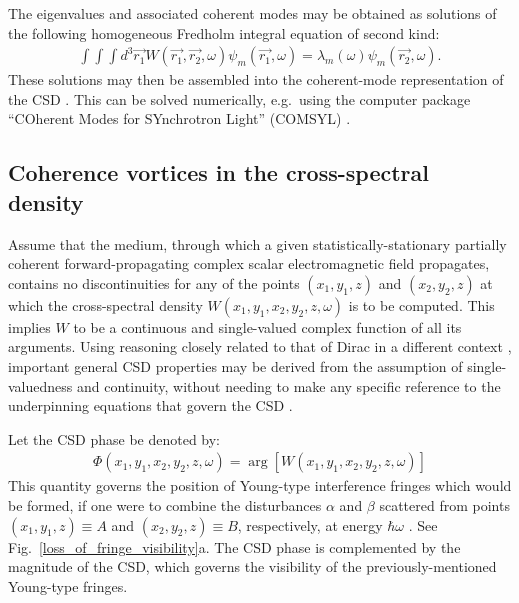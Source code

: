 \documentclass[%
 reprint,
 amsmath,amssymb,
 aps,
]{revtex4-1}
\begin{document}
The eigenvalues and associated coherent modes may be obtained as solutions of the following homogeneous Fredholm integral equation of second kind:
\begin{equation}
\begin{aligned}
\label{fredholm_equation}
\int \!\!\! \int \!\!\! \int d^3\vec{r_1}
W(\vec{r_1},\vec{r_2}, \omega){\psi}_m(\vec{r_1},
\omega)=\lambda_m(\omega)\psi_m(\vec{r_2}, \omega).
\end{aligned}
\end{equation}
These solutions may then be assembled into the coherent-mode representation of the CSD \cite{Wolf1982}.  This can be solved numerically, e.g.~using the computer package ``COherent Modes for SYnchrotron Light'' (COMSYL) \cite{glass}.

\subsection{Coherence vortices in the cross-spectral density}

Assume that the medium, through which a given statistically-stationary partially coherent forward-propagating complex scalar electromagnetic field propagates, contains no discontinuities for any of the points $(x_1,y_1,z)$ and $(x_2,y_2,z)$ at which the cross-spectral density $W(x_1,y_1,x_2,y_2,z,\omega)$ is to be computed. This implies $W$ to be a continuous and single-valued complex function of all its arguments.  Using reasoning closely related to that of Dirac in a different context \cite{Dirac1931}, important general CSD properties may be derived from the assumption of single-valuedness and continuity, without needing to make any specific reference to the underpinning  equations that govern the CSD \cite{Marasinghe2010}. 

Let the CSD phase be denoted by:
\begin{equation}
\begin{aligned}
\label{phase_of_W}
\Phi(x_1,y_1,x_2,y_2,z,\omega)=\arg[W(x_1,y_1,x_2,y_2,z,\omega)]
\end{aligned}
\end{equation}
This quantity governs the position of Young-type interference fringes which would be formed, if one were to combine the disturbances $\alpha$ and $\beta$ scattered from points $(x_1,y_1,z)\equiv A$ and $(x_2,y_2,z)\equiv B$, respectively, at energy $\hbar\omega$ \cite{mandel_wolf}.  See Fig.~\ref{loss_of_fringe_visibility}a. The  CSD phase is complemented by the magnitude of the CSD, which governs the visibility of the previously-mentioned Young-type fringes.
\end{document}
